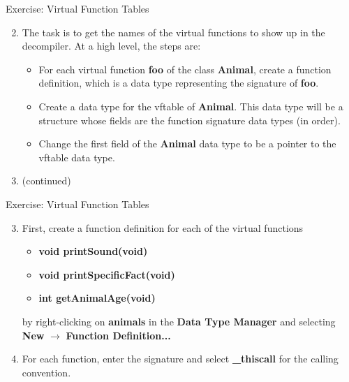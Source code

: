 \documentclass{beamer}
\begin{document}
\begin{frame}
\begin{block}{Exercise: Virtual Function Tables}
\begin{enumerate}
\setcounter{enumi}{1}
\item The task is to get the names of the virtual functions to show up in the decompiler. At a high level, the steps are:
\begin{itemize}
\item For each virtual function \textbf{foo} of the class \textbf{Animal}, create a function definition, which is a data type representing the signature of \textbf{foo}.
\item Create a data type for the vftable of \textbf{Animal}. This data type will be a structure whose fields are the function signature data types (in order).
\item Change the first field of the \textbf{Animal} data type to be a pointer to the vftable data type.
\end{itemize}
\item[] (continued)
\end{enumerate}
\end{block}
\end{frame}

\begin{frame}
\begin{block}{Exercise: Virtual Function Tables}
\begin{enumerate}
\setcounter{enumi}{2}
\item First, create a function definition for each of the virtual functions
\begin{itemize}
\item \textbf{void printSound(void)}
\item \textbf{void printSpecificFact(void)}
\item \textbf{int getAnimalAge(void)}
\end{itemize}
by right-clicking on \textbf{animals} in the \textbf{Data Type Manager} and selecting \textbf{New} $\rightarrow$ \textbf{Function Definition...}
\item[] For each function, enter the signature and select \textbf{\_thiscall} for the calling convention.
\end{enumerate}
\end{block}
\end{frame}
\end{document}
